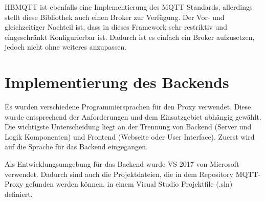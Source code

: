     HBMQTT ist ebenfalls eine Implementierung des \ac{MQTT} Standards, allerdings stellt diese Bibliothek auch einen Broker zur Verfügung. Der Vor- und gleichzeitiger Nachteil ist, dass in dieses Framework sehr restriktiv und eingeschränkt Konfigurierbar ist. Dadurch ist es einfach ein Broker aufzusetzen, jedoch nicht ohne weiteres anzupassen.
    \cite{jouanin_2018}
    
\section{Implementierung des Backends}

    Es wurden verschiedene Programmiersprachen für den Proxy verwendet. Diese wurde entsprechend der Anforderungen und dem Einsatzgebiet abhängig gewählt.
    Die wichtigste Unterscheidung liegt an der Trennung von Backend (Server und Logik Komponenten) und Frontend (Webseite oder User Interface).
    Zuerst wird auf die Sprache für das Backend eingegangen.
    
    Als Entwicklungsumgebung für das Backend wurde \ac{VS} 2017 \cite{microsoft_2019} von Microsoft verwendet. Dadurch sind auch die Projektdateien, die in dem Repository \glqq MQTT-Proxy\grqq{} \cite{eisenschmidt_2019} gefunden werden können, in einem Visual Studio Projektfile (.sln) definiert.
    
